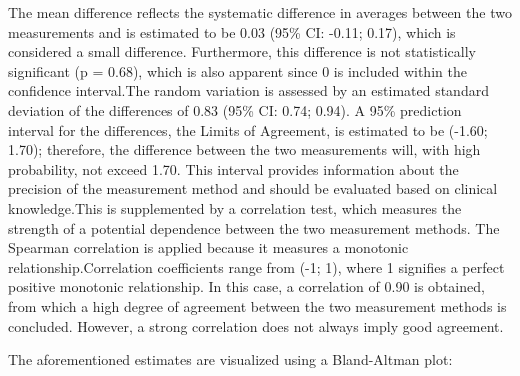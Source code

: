 \documentclass[
]{article}
\begin{document}
The mean difference reflects the systematic difference in averages
between the two measurements and is estimated to be 0.03 (95\% CI:
-0.11; 0.17), which is considered a small difference. Furthermore, this
difference is not statistically significant (p = 0.68), which is also
apparent since 0 is included within the confidence interval.The random
variation is assessed by an estimated standard deviation of the
differences of 0.83 (95\% CI: 0.74; 0.94). A 95\% prediction interval
for the differences, the Limits of Agreement, is estimated to be (-1.60;
1.70); therefore, the difference between the two measurements will, with
high probability, not exceed 1.70. This interval provides information
about the precision of the measurement method and should be evaluated
based on clinical knowledge.This is supplemented by a correlation test,
which measures the strength of a potential dependence between the two
measurement methods. The Spearman correlation is applied because it
measures a monotonic relationship.Correlation coefficients range from
(-1; 1), where 1 signifies a perfect positive monotonic relationship. In
this case, a correlation of 0.90 is obtained, from which a high degree
of agreement between the two measurement methods is concluded. However,
a strong correlation does not always imply good agreement.

The aforementioned estimates are visualized using a Bland-Altman plot:
\end{document}
